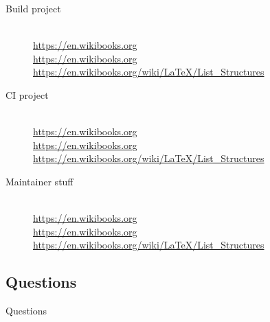 \documentclass{beamer}
\newenvironment*{dummyenv}{}{}
\begin{document}
\begin{frame}
    \begin{description}
        \item[Build project] \hfill \\
            \begin{dummyenv}
                \color{blue}\scriptsize
                \url{https://en.wikibooks.org} \\
                \url{https://en.wikibooks.org} \\
                \url{https://en.wikibooks.org/wiki/LaTeX/List_Structures} \\
            \end{dummyenv}
        \item[CI project] \hfill \\
            \begin{dummyenv}
                \color{blue}\scriptsize
                \url{https://en.wikibooks.org} \\
                \url{https://en.wikibooks.org} \\
                \url{https://en.wikibooks.org/wiki/LaTeX/List_Structures} \\
            \end{dummyenv}
        \item[Maintainer stuff] \hfill \\
            \begin{dummyenv}
                \color{blue}\scriptsize
                \url{https://en.wikibooks.org} \\
                \url{https://en.wikibooks.org} \\
                \url{https://en.wikibooks.org/wiki/LaTeX/List_Structures} \\
            \end{dummyenv}
    \end{description}
\end{frame}

\subsection{Questions}

\begin{frame}
    \begin{center}
        \Huge Questions
    \end{center}
\end{frame}
\end{document}
